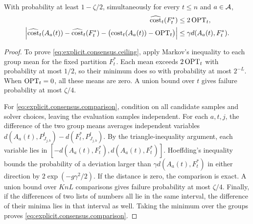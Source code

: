 \begin{lemma}\label{lem:explicit.estimated.costs}
With probability at least $ 1-\zeta/2 $, simultaneously for every $ t\le n $ and $ a\in\mathcal{A} $,
\begin{align}
    \widehat{\operatorname{cost}}_{t}(F_t^*)&\le2\operatorname{OPT}_t,\label{eq:explicit.consensus.ceiling}\\
    \left|
        \widehat{\operatorname{cost}}_{t}(A_a(t))-\widehat{\operatorname{cost}}_{t}(F_t^*)
        -\bigl(\operatorname{cost}_t(A_a(t))-\operatorname{OPT}_t\bigr)
    \right|
    &\le\gamma d(A_a(t),F_t^*).
    \label{eq:explicit.consensus.comparison}
\end{align}
\end{lemma}
\begin{proof}
To prove \eqref{eq:explicit.consensus.ceiling}, apply Markov's inequality to each group mean for the fixed partition $ F_t^* $.
Each mean exceeds $ 2\operatorname{OPT}_t $ with probability at most $ 1/2 $, so their minimum does so with probability at most $ 2^{-L} $.
When $ \operatorname{OPT}_t=0 $, all these means are zero.
A union bound over $ t $ gives failure probability at most $ \zeta/4 $.

For \eqref{eq:explicit.consensus.comparison}, condition on all candidate samples and solver choices, leaving the evaluation samples independent.
For each $ a,t,j $, the difference of the two group means averages independent variables $ d(A_a(t),P_{J_{j,b}}^t)-d(F_t^*,P_{J_{j,b}}^t) $.
By the triangle-inequality argument, each variable lies in $ [-d(A_a(t),F_t^*),d(A_a(t),F_t^*)] $.
Hoeffding's inequality bounds the probability of a deviation larger than $ \gamma d(A_a(t),F_t^*) $ in either direction by $ 2\exp(-g\gamma^2/2) $.
If the distance is zero, the comparison is exact.
A union bound over $ KnL $ comparisons gives failure probability at most $ \zeta/4 $.
Finally, if the differences of two lists of numbers all lie in the same interval, the difference of their minima lies in that interval as well.
Taking the minimum over the groups proves \eqref{eq:explicit.consensus.comparison}.

\end{proof}

